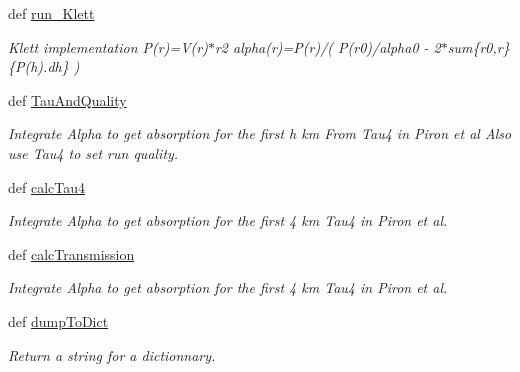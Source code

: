 \begin{DoxyCompactItemize}
\item 
def \hyperlink{classpLidarRun_1_1pLidarRun_a76e2ffb9b188fad04d51feb79acbd33c}{run\-\_\-\-Klett}
\begin{DoxyCompactList}\small\item\em Klett implementation P(r)=V(r)$\ast$r2 alpha(r)=P(r)/( P(r0)/alpha0 -\/ 2$\ast$sum\{r0,r\}\{P(h).dh\} ) \end{DoxyCompactList}\item 
def \hyperlink{classpLidarRun_1_1pLidarRun_a4844e3a98806f2351089092227ca997d}{Tau\-And\-Quality}
\begin{DoxyCompactList}\small\item\em Integrate Alpha to get absorption for the first h km From Tau4 in Piron et al Also use Tau4 to set run quality. \end{DoxyCompactList}\item 
def \hyperlink{classpLidarRun_1_1pLidarRun_a3253cb61ab67d3228ac146e0f843dfde}{calc\-Tau4}
\begin{DoxyCompactList}\small\item\em Integrate Alpha to get absorption for the first 4 km Tau4 in Piron et al. \end{DoxyCompactList}\item 
def \hyperlink{classpLidarRun_1_1pLidarRun_a9e852c0c83146f992308a9e903212cd7}{calc\-Transmission}
\begin{DoxyCompactList}\small\item\em Integrate Alpha to get absorption for the first 4 km Tau4 in Piron et al. \end{DoxyCompactList}\item 
def \hyperlink{classpLidarRun_1_1pLidarRun_ad2bfe11b5f2aef237a0bf6c937aed23f}{dump\-To\-Dict}
\begin{DoxyCompactList}\small\item\em Return a string for a dictionnary. \end{DoxyCompactList}\end{DoxyCompactItemize}
